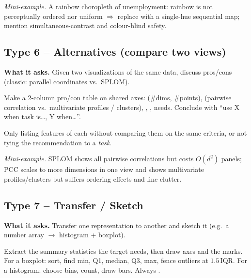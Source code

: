 \textit{Mini-example.} A rainbow choropleth of unemployment: rainbow is not
perceptually ordered nor uniform $\Rightarrow$ replace with a single-hue
sequential map; mention simultaneous-contrast and colour-blind safety.

\subsection{Type 6 -- Alternatives (compare two views)}

\textbf{What it asks.} Given two visualizations of the same data, discuss
pros/cons (classic: parallel coordinates vs.\ SPLOM).

\begin{exambox}
Make a 2-column pro/con table on shared axes:  (\#dims,
\#points),  (pairwise correlation vs.\ multivariate profiles /
clusters), , ,
 needs. Conclude with ``use X when task is\ldots, Y when\ldots''.
\end{exambox}

\begin{pitfall}
Only listing features of each without comparing them on the same criteria, or
not tying the recommendation to a \emph{task}.
\end{pitfall}

\textit{Mini-example.} SPLOM shows all pairwise correlations but costs
$O(d^2)$ panels; PCC scales to more dimensions in one view and shows
multivariate profiles/clusters but suffers ordering effects and line clutter.

\subsection{Type 7 -- Transfer / Sketch}

\textbf{What it asks.} Transfer one representation to another and sketch it
(e.g.\ a number array $\to$ histogram + boxplot).

\begin{exambox}
Extract the summary statistics the target needs, then draw axes and the marks.
For a boxplot: sort, find min, Q1, median, Q3, max, fence outliers at
$1.5\,\mathrm{IQR}$. For a histogram: choose bins, count, draw bars.
Always .
\end{exambox}

